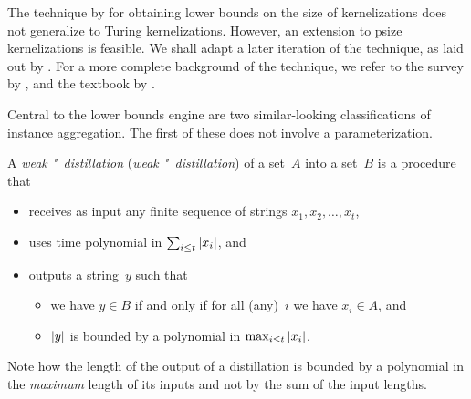 The technique by \textcite{bodlaender2009problems} for obtaining lower bounds on the size of kernelizations does not generalize to Turing kernelizations.
However, an extension to psize kernelizations is feasible.
We shall adapt a later iteration of the technique, as laid out by \textcite[Section~3]{bodlaender2014kernelization}.
For a more complete background of the technique, we refer to the survey by \textcite{kratsch2014recent}, and the textbook by \textcite{fomin2019kernelization}.

Central to the lower bounds engine are two similar-looking classifications of instance aggregation.
The first of these does not involve a parameterization.
\begin{definition}
\label{def:distillation}%
  A \emph{weak "~distillation} (\emph{weak "~distillation}) of a set~$A$ into a set~$B$ is a procedure that
  \begin{itemize}
  \item receives as input any finite sequence of strings $x_1, x_2, \ldots, x_t$,
  \item uses time polynomial in $\sum_{i \le t} {\lvert x_i\rvert}$, and
  \item outputs a string~$y$ such that
    \begin{itemize}
    \item we have $y \in B$ if and only if for all (any)~$i$ we have $x_i \in A$, and
    \item ${\lvert y\rvert}$ is bounded by a polynomial in $\max_{i \le t} {\lvert x_i\rvert}$.
    \end{itemize}
  \end{itemize}
\end{definition}

Note how the length of the output of a distillation is bounded by a polynomial in the \emph{maximum} length of its inputs and not by the sum of the input lengths.

